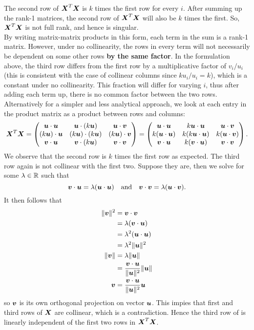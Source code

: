 \documentclass[12pt]{article}
\begin{document}
	The second row of $\boldsymbol{X}^T\boldsymbol{X}$ is $k$ times the first row for every $i$. After summing up the rank-1 matrices, the second row of $\boldsymbol{X}^T\boldsymbol{X}$ will also be $k$ times the first. So, $\boldsymbol{X}^T\boldsymbol{X}$ is not full rank, and hence is singular. \\
	
	By writing matrix-matrix products in this form, each term in the sum is a rank-1 matrix. However, under no collinearity, the rows in every term will not necessarily be dependent on some other rows \textbf{by the same factor}. In the formulation above, the third row differs from the first row by a multiplicative factor of $v_i/u_i$ (this is consistent with the case of collinear columns since $ku_i/u_i=k$), which is a constant under no collinearity. This fraction will differ for varying $i$, thus after adding each term up, there is no common factor between the two rows.\\
	
	Alternatively for a simpler and less analytical approach, we look at each entry in the product matrix as a product between rows and columns:
	$$\boldsymbol{X}^T\boldsymbol{X}=\begin{pmatrix}
		\boldsymbol{u}\cdot\boldsymbol{u} & \boldsymbol{u}\cdot(k\boldsymbol{u}) & \boldsymbol{u}\cdot\boldsymbol{v}\\
		(k\boldsymbol{u})\cdot\boldsymbol{u} & (k\boldsymbol{u})\cdot(k\boldsymbol{u}) & (k\boldsymbol{u})\cdot\boldsymbol{v} \\
		\boldsymbol{v}\cdot\boldsymbol{u} & \boldsymbol{v}\cdot(k\boldsymbol{u}) & \boldsymbol{v}\cdot\boldsymbol{v}
	\end{pmatrix}=\begin{pmatrix}
		\boldsymbol{u}\cdot\boldsymbol{u} & k\boldsymbol{u}\cdot\boldsymbol{u} & \boldsymbol{u}\cdot\boldsymbol{v}\\
		k(\boldsymbol{u}\cdot\boldsymbol{u}) & k(k\boldsymbol{u}\cdot\boldsymbol{u}) & k(\boldsymbol{u}\cdot\boldsymbol{v}) \\
		\boldsymbol{v}\cdot\boldsymbol{u} & k(\boldsymbol{v}\cdot\boldsymbol{u}) & \boldsymbol{v}\cdot\boldsymbol{v}
	\end{pmatrix}.$$
	We observe that the second row is $k$ times the first row as expected. The third row again is not collinear with the first two. Suppose they are, then we solve for some $\lm\in\RR$ such that
	$$\boldsymbol{v}\cdot\boldsymbol{u}=\lambda(\boldsymbol{u}\cdot\boldsymbol{u}) \quad \text{and}\quad \boldsymbol{v}\cdot\boldsymbol{v}=\lambda(\boldsymbol{u}\cdot\boldsymbol{v}).$$
	It then follows that
	\begin{align*}
		\|\boldsymbol{v}\|^2&=\boldsymbol{v}\cdot\boldsymbol{v}\\
		&=\lambda(\boldsymbol{v}\cdot\boldsymbol{u})\\
		&=\lambda^2(\boldsymbol{u}\cdot\boldsymbol{u})\\
		&=\lambda^2\|\boldsymbol{u}\|^2\\ 
		\|\boldsymbol{v}\|&=\lambda\|\boldsymbol{u}\|\\
		&=\dfrac{\boldsymbol{v}\cdot\boldsymbol{u}}{\|\boldsymbol{u}\|^2}\|\boldsymbol{u}\|\\
		\boldsymbol{v}&=\dfrac{\boldsymbol{v}\cdot\boldsymbol{u}}{\|\boldsymbol{u}\|^2}\boldsymbol{u}
	\end{align*}
	so $\boldsymbol{v}$ is its own orthogonal projection on vector $\boldsymbol{u}$. This impies that first and third rows of $\boldsymbol{X}$ are collinear, which is a contradiction. Hence the third row of is linearly independent of the first two rows in $\boldsymbol{X}^T\boldsymbol{X}$. 
	
\end{document}

